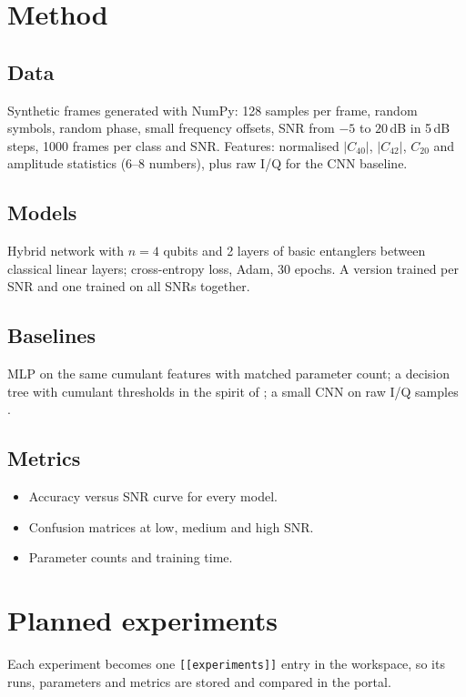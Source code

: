 \documentclass[11pt,a4paper]{article}
\begin{document}
\section{Method}
\subsection{Data}
Synthetic frames generated with NumPy: 128 samples per frame, random symbols, random phase, small
frequency offsets, SNR from $-5$ to $20$\,dB in 5\,dB steps, 1000 frames per class and SNR. Features:
normalised $|C_{40}|$, $|C_{42}|$, $C_{20}$ and amplitude statistics (6--8 numbers), plus raw I/Q for
the CNN baseline.

\subsection{Models}
Hybrid network with $n=4$ qubits and 2 layers of basic entanglers between classical linear layers;
cross-entropy loss, Adam, 30 epochs. A version trained per SNR and one trained on all SNRs together.

\subsection{Baselines}
MLP on the same cumulant features with matched parameter count; a decision tree with cumulant
thresholds in the spirit of \citet{swami2000}; a small CNN on raw I/Q samples \citep{oshea2016}.

\subsection{Metrics}
\begin{itemize}
  \item Accuracy versus SNR curve for every model.
  \item Confusion matrices at low, medium and high SNR.
  \item Parameter counts and training time.
\end{itemize}

\section{Planned experiments}
Each experiment becomes one \texttt{[[experiments]]} entry in the workspace, so its runs, parameters
and metrics are stored and compared in the portal.
\end{document}
